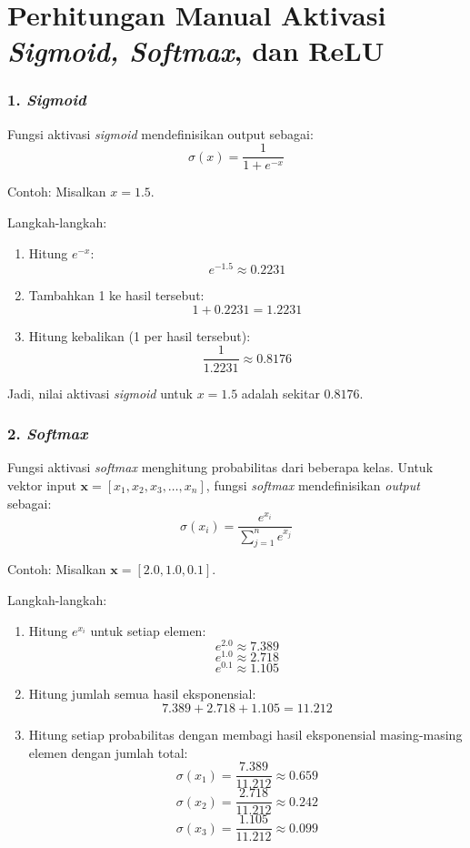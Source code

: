 \chapter{Perhitungan Manual Aktivasi \textit{Sigmoid, Softmax}, dan ReLU}

\subsection*{1. \textit{Sigmoid}}
Fungsi aktivasi \textit{sigmoid} mendefinisikan output sebagai:
\[
\sigma(x) = \frac{1}{1 + e^{-x}}
\]

Contoh: Misalkan \( x = 1.5 \).

Langkah-langkah:
\begin{enumerate}
    \item Hitung \( e^{-x} \):
    \[
    e^{-1.5} \approx 0.2231
    \]

    \item Tambahkan 1 ke hasil tersebut:
    \[
    1 + 0.2231 = 1.2231
    \]

    \item Hitung kebalikan (1 per hasil tersebut):
    \[
    \frac{1}{1.2231} \approx 0.8176
    \]
\end{enumerate}

Jadi, nilai aktivasi \textit{sigmoid} untuk \( x = 1.5 \) adalah sekitar \( 0.8176 \).

\subsection*{2. \textit{Softmax}}
Fungsi aktivasi \textit{softmax} menghitung probabilitas dari beberapa kelas. Untuk vektor input \(\mathbf{x} = [x_1, x_2, x_3, \ldots, x_n]\), fungsi \textit{softmax} mendefinisikan \textit{output} sebagai:
\[
\sigma(x_i) = \frac{e^{x_i}}{\sum_{j=1}^{n} e^{x_j}}
\]

Contoh: Misalkan \(\mathbf{x} = [2.0, 1.0, 0.1]\).

Langkah-langkah:
\begin{enumerate}
    \item Hitung \( e^{x_i} \) untuk setiap elemen:
    \[
    e^{2.0} \approx 7.389
    \]
    \[
    e^{1.0} \approx 2.718
    \]
    \[
    e^{0.1} \approx 1.105
    \]

    \item Hitung jumlah semua hasil eksponensial:
    \[
    7.389 + 2.718 + 1.105 = 11.212
    \]

    \item Hitung setiap probabilitas dengan membagi hasil eksponensial masing-masing elemen dengan jumlah total:
    \[
    \sigma(x_1) = \frac{7.389}{11.212} \approx 0.659
    \]
    \[
    \sigma(x_2) = \frac{2.718}{11.212} \approx 0.242
    \]
    \[
    \sigma(x_3) = \frac{1.105}{11.212} \approx 0.099
    \]
\end{enumerate}

